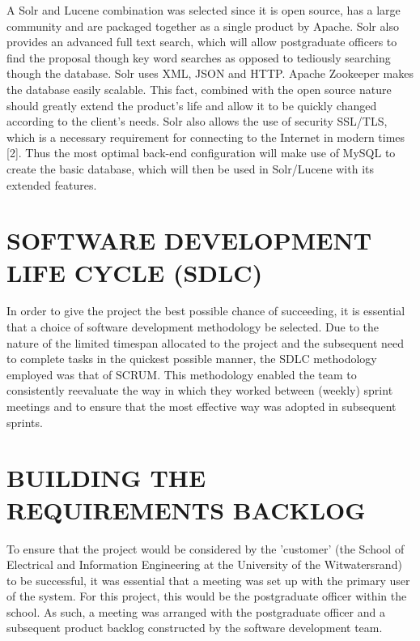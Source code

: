 \documentclass[journal,comsoc]{IEEEtran}
\begin{document}
A Solr and Lucene combination was selected since it is open source, has a large community and are packaged together as a single product by Apache. Solr also provides an advanced full text search, which will allow postgraduate officers to find the proposal though key word searches as opposed to tediously searching though the database. Solr uses XML, JSON and HTTP. Apache Zookeeper makes the database easily scalable. This fact, combined with the open source nature should greatly extend the product's life and allow it to be quickly changed according to the client's needs. Solr also allows the use of security SSL/TLS, which is a necessary requirement for connecting to the Internet in modern times [2]. Thus the most optimal back-end configuration will make use of MySQL to create the basic database, which will then be used in Solr/Lucene with its extended features.


\section{SOFTWARE DEVELOPMENT LIFE CYCLE (SDLC)}

In order to give the project the best possible chance of succeeding, it is essential that a choice of software development methodology be selected. Due to the nature of the limited timespan allocated to the project and the subsequent need to complete tasks in the quickest possible manner, the SDLC methodology employed was that of SCRUM. This methodology enabled the team to consistently reevaluate the way in which they worked between (weekly) sprint meetings and to ensure that the most effective way was adopted in subsequent sprints.


\section{BUILDING THE REQUIREMENTS BACKLOG}

To ensure that the project would be considered by the 'customer' (the School of Electrical and Information Engineering at the University of the Witwatersrand) to be successful, it was essential that a meeting was set up with the primary user of the system. For this project, this would be the postgraduate officer within the school. As such, a meeting was arranged with the postgraduate officer and a subsequent product backlog constructed by the software development team.
\end{document}
